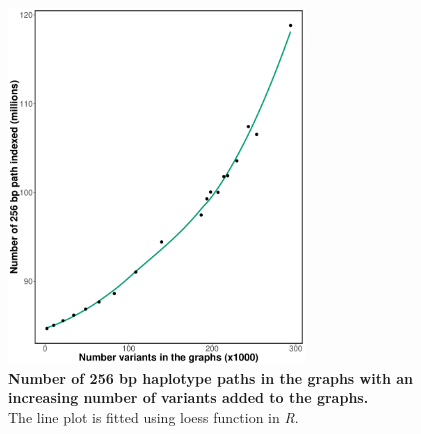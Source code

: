 \documentclass[../main.tex]{subfiles}
\begin{document}
\fi


\newpage

\setcounter{subsection}{0}
\renewcommand \thesubsection {Note S3.\arabic{subsection}}
\renewcommand \theHsubsection {Note S3.\arabic{subsection}}
\setcounter{figure}{0}
\renewcommand \thefigure {S3.\arabic{figure}}
\setcounter{table}{0}
\renewcommand \thetable {S3.\arabic{table}}

\begin{flushleft}
    
\begin{figure}[!htb]
    \centering
    \includegraphics[width=0.7\textwidth]{paper2/supplement/sp31.pdf}
    \caption[Number of 256 bp haplotype paths]{\textbf{Number of 256 bp haplotype paths in the graphs with an increasing
    number of variants added to the graphs.} \\
    \small{The line plot is fitted using loess function in \emph{R}.}}
    \label{sup_fig:s31}
\end{figure}


\newpage


\end{flushleft}
\end{document}
